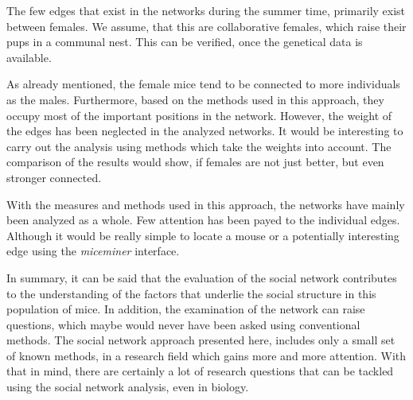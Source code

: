 The few edges that exist in the networks during the summer time, primarily exist between females. We assume, that this are collaborative females, which raise their pups in a communal nest. This can be verified, once the genetical data is available.

As already mentioned, the female mice tend to be connected to more individuals as the males. Furthermore, based on the methods used in this approach, they occupy most of the important positions in the network. However, the weight of the edges has been neglected in the analyzed networks. It would be interesting to carry out the analysis using methods which take the weights into account. The comparison of the results would show, if females are not just better, but even stronger connected.

With the measures and methods used in this approach, the networks have mainly been analyzed as a whole. Few attention has been payed to the individual edges. Although it would be really simple to locate a mouse or a potentially interesting edge using the \textit{miceminer} interface.

In summary, it can be said that the evaluation of the social network contributes to the understanding of the factors that underlie the social structure in this population of mice. In addition, the examination of the network can raise questions, which maybe would never have been asked using conventional methods. The social network approach presented here, includes only a small set of known methods, in a research field which gains more and more attention. With that in mind, there are certainly a lot of research questions that can be tackled using the social network analysis, even in biology.
   




